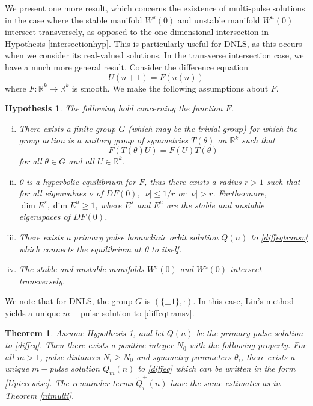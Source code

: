 \documentclass[12pt]{elsarticle}
\def\R{{\mathbb R}}
\newtheorem{theorem}{Theorem}
\newtheorem{hypothesis}{Hypothesis}
\begin{document}
We present one more result, which concerns the existence of multi-pulse solutions in the case where the stable manifold $W^s(0)$ and unstable manifold $W^u(0)$ intersect transversely, as opposed to the one-dimensional intersection in Hypothesis \ref{intersectionhyp}. This is particularly useful for DNLS, as this occurs when we consider its real-valued solutions. In the transverse intersection case, we have a much more general result. Consider the difference equation
\begin{equation}\label{diffeqtransv}
U(n+1) = F(u(n))
\end{equation}
where $F: \R^k \rightarrow \R^k$ is smooth. We make the following assumptions about $F$.

\begin{hypothesis}\label{transversehyp}
The following hold concerning the function $F$.
\begin{enumerate}[(i)]
\item There exists a finite group $G$ (which may be the trivial group) for which the group action is a unitary group of symmetries $T(\theta)$ on $\R^k$ such that 
\begin{equation}\label{symmetrytransverse}
F(T(\theta)U) = F(U)T(\theta)
\end{equation}
for all $\theta \in G$ and all $U \in \R^k$. 
\item 0 is a hyperbolic equilibrium for $F$, thus there exists a radius $r > 1$ such that for all eigenvalues $\nu$ of $DF(0)$, $|\nu| \leq 1/r$ or $|\nu| > r$. Furthermore, $\dim E^s, \dim E^u \geq 1$, where $E^s$ and $E^u$ are the stable and unstable eigenspaces of $DF(0)$.
\item There exists a primary pulse homoclinic orbit solution $Q(n)$ to \eqref{diffeqtransv} which connects the equilibrium at 0 to itself.
\item The stable and unstable manifolds $W^s(0)$ and $W^u(0)$ intersect transversely.
\end{enumerate}
\end{hypothesis}
We note that for DNLS, the group $G$ is $( \{\pm 1\}, \cdot)$. In this case, Lin's method yields a unique $m-$pulse solution to \eqref{diffeqtransv}.

\begin{theorem}\label{transversemulti}
Assume Hypothesis \ref{transversehyp}, and let $Q(n)$ be the primary pulse solution to \eqref{diffeq}. Then there exists a positive integer $N_0$ with the following property. For all $m > 1$, pulse distances $N_i \geq N_0$ and symmetry parameters $\theta_i$, there exists a unique $m-$pulse solution $Q_m(n)$ to \eqref{diffeq} which can be written in the form \eqref{Upiecewise}. The remainder terms $\tilde{Q}_i^\pm(n)$ have the same estimates as in Theorem \ref{ntmulti}.
\end{theorem}
\end{document}
